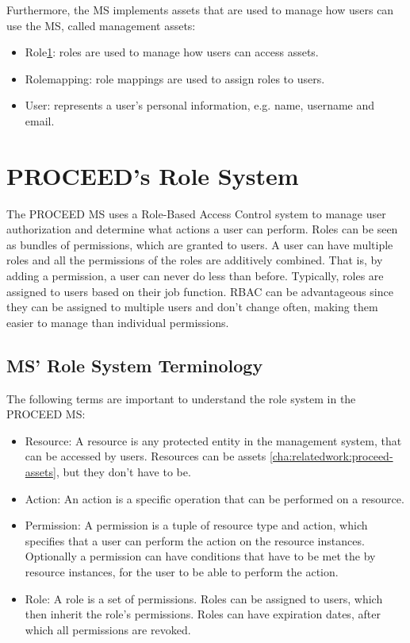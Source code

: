 Furthermore, the MS implements assets that are used to manage how users can use the MS,
called management assets:

\begin{itemize}
	\item Role\ref{cha:relatedwork:proceedroles}: roles are used to manage how users can access assets.
	\item{Rolemapping}: role mappings are used to assign roles to users.
	\item User: represents a user's personal information, e.g. name, username and email.
\end{itemize}


\section{PROCEED's Role System}
\label{cha:relatedwork:proceedroles}

The PROCEED MS uses a Role-Based Access Control %
system to manage user authorization and determine what actions a user can perform.
Roles can be seen as bundles of permissions, which are granted to users.
A user can have multiple roles and all the permissions of the roles are additively
combined. That is, by adding a permission, a user can never do less than before.
Typically, roles are assigned to users based on their job function.
RBAC can be advantageous since they can be assigned to multiple users and
don't change often, making them easier to manage than individual permissions.

\subsection{MS' Role System Terminology}
\label{cha:relatedwork:proceedroles:terminology}

The following terms are important to understand the role system in the PROCEED MS:

\begin{itemize}
	\item Resource: A resource is any protected entity in the management system, that can be
	      accessed by users. Resources can be assets \ref{cha:relatedwork:proceed-assets}, but
	      they don't have to be.
	\item Action: An action is a specific operation that can be performed on a resource.
	\item Permission: A permission is a tuple of resource type and action, which specifies that a
	      user can perform the action on the resource instances. Optionally a permission can have
	      conditions that have to be met the by resource instances, for the user to be able to perform the action.
	\item Role: A role is a set of permissions. Roles can be assigned to users, which then
	      inherit the role's permissions. Roles can have expiration dates, after which all
	      permissions are revoked.
\end{itemize}

